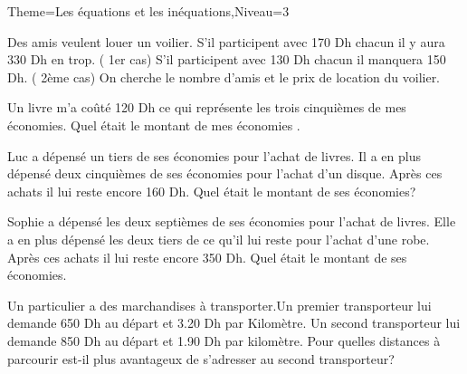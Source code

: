 \documentclass[a4paper,12pt]{article}
\begin{document}
\begin{Maquette}[Fiche]{Theme=Les équations et les inéquations,Niveau=3}
\begin{exercice}
Des amis veulent louer un voilier.
S'il participent avec 170 Dh chacun il y aura
330 Dh en trop. ( 1er cas)
S'il participent avec 130 Dh chacun il
manquera 150 Dh. ( 2ème cas)
On cherche le nombre d'amis et le prix
de location du voilier.
\end{exercice}


\begin{exercice}
Un livre m'a coûté 120 Dh ce qui représente
les trois cinquièmes de mes économies.
Quel était le montant de mes économies . 
\end{exercice}

\begin{exercice}
Luc a dépensé un tiers de ses économies
pour l'achat de livres. Il a en plus dépensé
deux cinquièmes de ses économies pour
l'achat d'un disque. Après ces achats il
lui reste encore 160 Dh.
Quel était le montant de ses économies?
\end{exercice}

\begin{exercice}
Sophie a dépensé les deux septièmes de
ses économies pour l'achat de livres. Elle
a en plus dépensé les deux tiers de ce
qu'il lui reste pour l'achat d'une robe.
Après ces achats il lui reste encore 350 Dh.
Quel était le montant de ses économies. 
\end{exercice}

\begin{exercice}
Un particulier a des marchandises à transporter.Un premier transporteur lui demande 650 Dh au départ et 3.20 Dh par Kilomètre. Un second transporteur lui demande 850 Dh au départ et 1.90 Dh par kilomètre. Pour quelles distances à parcourir est-il plus avantageux de s'adresser au second transporteur?
\end{exercice}





\end{Maquette}
\end{document}
